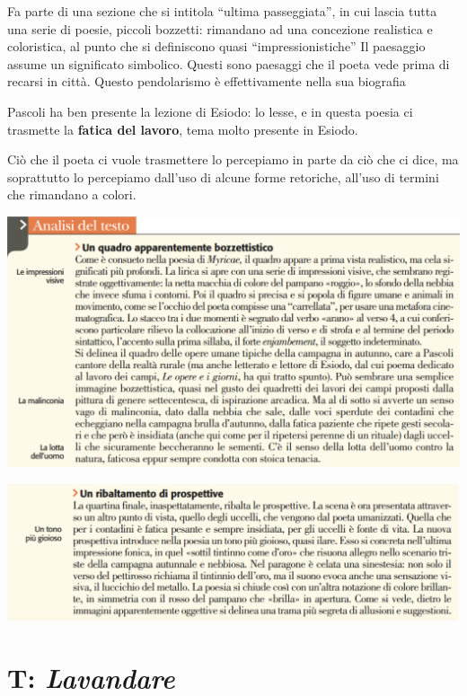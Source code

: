 \documentclass[a4paper, twoside, titlepage]{book}
\begin{document}
Fa parte di una sezione che si intitola “ultima passeggiata”, in cui lascia tutta una serie di poesie, piccoli bozzetti: rimandano ad una concezione realistica e coloristica, al punto che si definiscono quasi “impressionistiche”
Il paesaggio assume un significato simbolico.
Questi sono paesaggi che il poeta vede prima di recarsi in città.
Questo pendolarismo è effettivamente nella sua biografia

Pascoli ha ben presente la lezione di Esiodo: lo lesse, e in questa poesia ci trasmette la \textbf{fatica del lavoro}, tema molto presente in Esiodo.

Ciò che il poeta ci vuole trasmettere lo percepiamo in parte da ciò che ci dice, ma soprattutto lo percepiamo dall’uso di alcune forme retoriche, all’uso di termini che rimandano a colori.

\begin{center}
\includegraphics[width=\textwidth]{arano1}
\end{center}

\begin{center}
\includegraphics[width=\textwidth]{arano2}
\end{center}

\section{T: \textit{Lavandare}}
\end{document}
